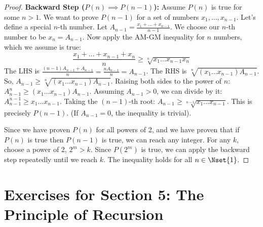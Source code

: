 \begin{enumerate}
\begin{proof}
    \textbf{Backward Step ($P(n) \implies P(n-1)$):}
    Assume $P(n)$ is true for some $n>1$. We want to prove $P(n-1)$ for a set of numbers $x_1, \dots, x_{n-1}$.
    Let's define a special $n$-th number. Let $A_{n-1} = \frac{x_1+\dots+x_{n-1}}{n-1}$.
    We choose our $n$-th number to be $x_n = A_{n-1}$.
    Now apply the AM-GM inequality for $n$ numbers, which we assume is true:
    $$ \frac{x_1+\dots+x_{n-1}+x_n}{n} \ge \sqrt[n]{x_1\dots x_{n-1}x_n} $$
    The LHS is $\frac{(n-1)A_{n-1} + A_{n-1}}{n} = \frac{nA_{n-1}}{n} = A_{n-1}$.
    The RHS is $\sqrt[n]{(x_1\dots x_{n-1})A_{n-1}}$.
    So, $A_{n-1} \ge \sqrt[n]{(x_1\dots x_{n-1})A_{n-1}}$.
    Raising both sides to the power of $n$:
    $ A_{n-1}^n \ge (x_1\dots x_{n-1})A_{n-1} $.
    Assuming $A_{n-1} > 0$, we can divide by it:
    $ A_{n-1}^{n-1} \ge x_1\dots x_{n-1} $.
    Taking the $(n-1)$-th root:
    $ A_{n-1} \ge \sqrt[n-1]{x_1\dots x_{n-1}} $.
    This is precisely $P(n-1)$. (If $A_{n-1}=0$, the inequality is trivial).
    
    Since we have proven $P(n)$ for all powers of 2, and we have proven that if $P(n)$ is true then $P(n-1)$ is true, we can reach any integer. For any $k$, choose a power of 2, $2^m > k$. Since $P(2^m)$ is true, we can apply the backward step repeatedly until we reach $k$. The inequality holds for all $n \in \Nset{1}$.
    \end{proof}
\end{enumerate}

\section*{Exercises for Section 5: The Principle of Recursion}

